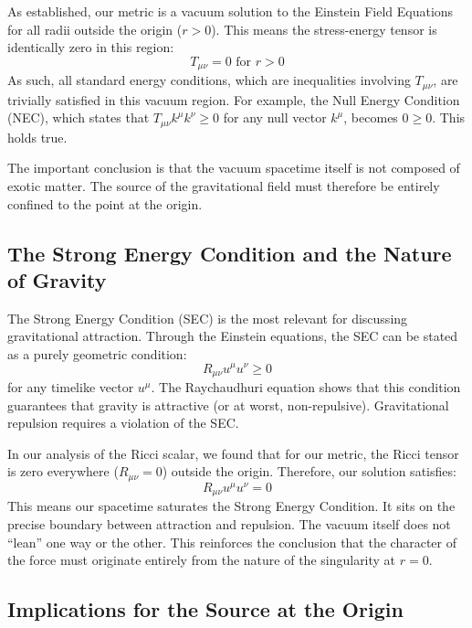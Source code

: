 \documentclass[%
  reprint,
  superscriptaddress,
  showpacs,
  showkeys,
  amsmath,amssymb,
  pra,
  longbibliography,
  floatfix,
]{revtex4-2}
\begin{document}
As established, our metric is a vacuum solution to the Einstein Field Equations for all radii outside the origin ($r>0$). This means the stress-energy tensor is identically zero in this region:
\begin{equation}
    T_{\mu\nu} = 0 \text{ for } r > 0
\end{equation}
As such, all standard energy conditions, which are inequalities involving $T_{\mu\nu}$, are trivially satisfied in this vacuum region. For example, the Null Energy Condition (NEC), which states that $T_{\mu\nu}k^\mu k^\nu \ge 0$ for any null vector $k^\mu$, becomes $0 \ge 0$. This holds true.

The important conclusion is that the vacuum spacetime itself is not composed of exotic matter. The source of the gravitational field must therefore be entirely confined to the point at the origin.

\subsection{The Strong Energy Condition and the Nature of Gravity}

The Strong Energy Condition (SEC) is the most relevant for discussing gravitational attraction. Through the Einstein equations, the SEC can be stated as a purely geometric condition:
\begin{equation}
    R_{\mu\nu}u^\mu u^\nu \ge 0
\end{equation}
for any timelike vector $u^\mu$. The Raychaudhuri equation shows that this condition guarantees that gravity is attractive (or at worst, non-repulsive). Gravitational repulsion requires a violation of the SEC.

In our analysis of the Ricci scalar, we found that for our metric, the Ricci tensor is zero everywhere ($R_{\mu\nu}=0$) outside the origin. Therefore, our solution satisfies:
\begin{equation}
    R_{\mu\nu}u^\mu u^\nu = 0
\end{equation}
This means our spacetime {saturates the Strong Energy Condition}. It sits on the precise boundary between attraction and repulsion. The vacuum itself does not ``lean'' one way or the other. This reinforces the conclusion that the character of the force must originate entirely from the nature of the singularity at $r=0$.

\subsection{Implications for the Source at the Origin}
\end{document}
